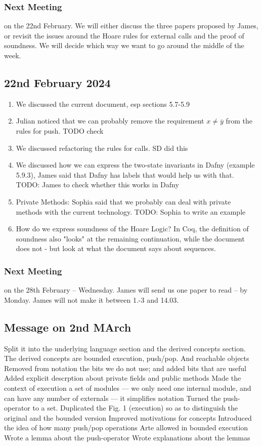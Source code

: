 \documentclass[acmsmall,review,anonymous]{acmart}\settopmatter{printfolios=true}
\begin{document}
\subsubsection*{Next Meeting}  on the 22nd February. We will either discuss the three papers proposed by James, or revisit the issues around the Hoare rules for external calls and the proof of soundness. We will decide which way we want to go around the middle of the week.


\subsection* {22nd February 2024}
\begin{enumerate}
\item
We discussed the current document, esp sections 5.7-5.9
\item
Julian noticed that we can probably remove the requirement $x\neq\overline{y}$ from the rules for push. TODO check
\item
We discussed refactoring the rules for calls. SD did this
\item
We discussed how we can express the two-state invariants in Dafny (example 5.9.3), James said that Dafny has labels that would help us with that. TODO: James to check whether this works in Dafny
\item 
Private Methods: Sophia said that we probably can deal with private methods with the current technology. TODO: Sophia to write an example
\item
How do we express soundness of the Hoare Logic? In Coq, the definition of soundness also "looks"  at the remaining continuation, while the document does not - but look at what the document says about sequences.
 \end{enumerate}
 
 \subsubsection*{Next Meeting}  on the 28th February -- Wednesday. James will send us one paper to read -- by Monday. 
 James will not make it between 1.-3 and 14.03.
 
 \subsection*{Message on 2nd MArch}
 
  
Split it into the underlying language section and the derived concepts section. The derived concepts are bounded execution, push/pop. And reachable objects
Removed from notation the bits we do not use; and added bits that are useful
Added explicit descrption about private fields and public methods 
Made the context of execution a set of modules — we only need one internal module, and can have any number of externals — it simplifies notation
Turned the push-operator to a set.
Duplicated the Fig. 1 (execution) so as to distinguish the original and the bounded version
Improved motivations for concepts
Introduced the idea of how many push/pop operations Arte allowed in bounded execution
Wrote a lemma about the push-operator
Wrote explanations about the lemmas
\end{document}
